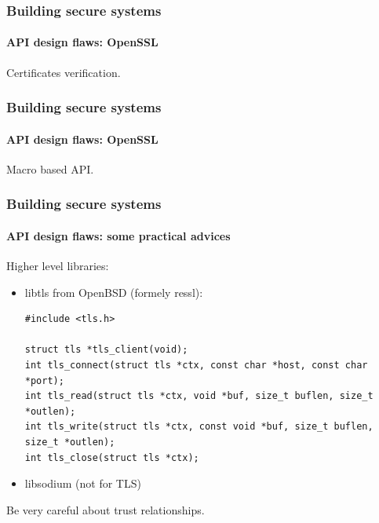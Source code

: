 \documentclass[12pt,t]{beamer}
\begin{document}
\begin{frame}
\frametitle{Building secure systems}
\framesubtitle{API design flaws: OpenSSL}
Certificates verification.
\end{frame}

\begin{frame}
\frametitle{Building secure systems}
\framesubtitle{API design flaws: OpenSSL}
Macro based API.
\end{frame}

\begin{frame}[fragile]
\frametitle{Building secure systems}
\framesubtitle{API design flaws: some practical advices}
Higher level libraries:
\begin{itemize}
\item libtls from OpenBSD (formely ressl):
\begin{tiny}
\begin{verbatim}
#include <tls.h>

struct tls *tls_client(void);
int tls_connect(struct tls *ctx, const char *host, const char *port);
int tls_read(struct tls *ctx, void *buf, size_t buflen, size_t *outlen);
int tls_write(struct tls *ctx, const void *buf, size_t buflen, size_t *outlen);
int tls_close(struct tls *ctx);
\end{verbatim}
\end{tiny}
\item libsodium (not for TLS)
\end{itemize}
Be very careful about trust relationships.
\end{frame}
\end{document}
